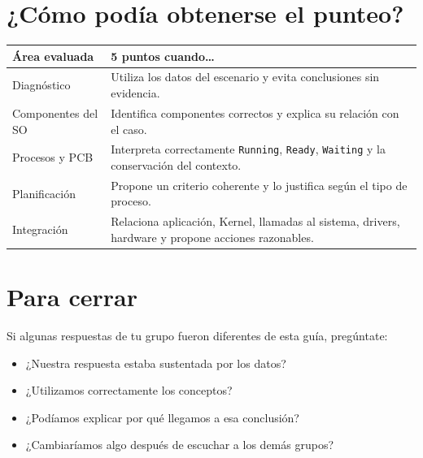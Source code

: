 \documentclass[
  spanish,
  letterpaper,
]{scrbook}
\newcounter{none} %
\providecommand{\tightlist}{%
  \setlength{\itemsep}{0pt}\setlength{\parskip}{0pt}}
\begin{document}

\chapter{¿Cómo podía obtenerse el
punteo?}\label{cuxf3mo-poduxeda-obtenerse-el-punteo}

{\def\LTcaptype{none} %
\begin{longtable}[]{@{}
  >{\raggedright\arraybackslash}p{}
  >{\raggedright\arraybackslash}p{}@{}}
\toprule\noalign{}
\begin{minipage}[b]{\linewidth}\raggedright
Área evaluada
\end{minipage} & \begin{minipage}[b]{\linewidth}\raggedright
5 puntos cuando\ldots{}
\end{minipage} \\
\midrule\noalign{}
\endhead
\bottomrule\noalign{}
\endlastfoot
Diagnóstico & Utiliza los datos del escenario y evita conclusiones sin
evidencia. \\
Componentes del SO & Identifica componentes correctos y explica su
relación con el caso. \\
Procesos y PCB & Interpreta correctamente \texttt{Running},
\texttt{Ready}, \texttt{Waiting} y la conservación del contexto. \\
Planificación & Propone un criterio coherente y lo justifica según el
tipo de proceso. \\
Integración & Relaciona aplicación, Kernel, llamadas al sistema,
drivers, hardware y propone acciones razonables. \\
\end{longtable}
}


\chapter{Para cerrar}\label{para-cerrar}

Si algunas respuestas de tu grupo fueron diferentes de esta guía,
pregúntate:

\begin{itemize}
\tightlist
\item
  ¿Nuestra respuesta estaba sustentada por los datos?
\item
  ¿Utilizamos correctamente los conceptos?
\item
  ¿Podíamos explicar por qué llegamos a esa conclusión?
\item
  ¿Cambiaríamos algo después de escuchar a los demás grupos?
\end{itemize}
\end{document}
